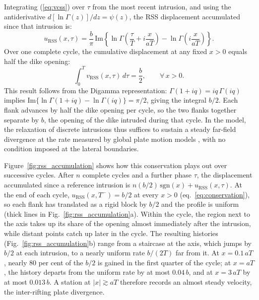 \documentclass[extra]{gji}
\newcommand{\IM}{\mathrm{Im}}
\begin{document}
Integrating (\ref{eq:vcss}) over $\tau$ from the most recent intrusion,
and using the antiderivative $d[\ln\Gamma(z)]/dz = \psi(z)$, the RSS
displacement accumulated since that intrusion is:
\begin{equation}
u_{\text{RSS}}(x,\tau) =
  \frac{b}{\pi}\,\IM\!\left\{
    \ln\Gamma\!\left(\frac{\tau}{T}+i\frac{x}{aT}\right)
    -\ln\Gamma\!\left(i\frac{x}{aT}\right)
  \right\}.
\label{eq:ucss}
\end{equation}
Over one complete cycle, the cumulative displacement at any fixed $x>0$ equals
half the dike opening:
\begin{equation}
\int_0^T v_{\text{RSS}}(x,\tau)\,d\tau = \frac{b}{2}, \qquad \forall\,x>0.
\label{eq:conservation}
\end{equation}
This result follows from the Digamma representation:
$\Gamma(1+iq) = iq\,\Gamma(iq)$ implies
$\IM\{\ln\Gamma(1+iq)-\ln\Gamma(iq)\} = \pi/2$, giving the integral $b/2$.
Each flank advances by half the dike opening per cycle, so the two flanks
together separate by $b$, the opening of the dike intruded during that
cycle. In the model, the relaxation of discrete intrusions thus suffices to
sustain a steady far-field divergence at the rate measured by global plate
motion models \citep{saria2014present,stamps2021redefining}, with no
condition imposed at the lateral boundaries.

Figure~\ref{fig:rss_accumulation} shows how this conservation plays out
over successive cycles.  After $n$ complete cycles and a further phase
$\tau$, the displacement accumulated since a reference intrusion is
$n(b/2)\,\mathrm{sgn}(x) + u_{\text{RSS}}(x,\tau)$.  At the end of each
cycle, $u_{\text{RSS}}(x,T^-) = b/2$ at every $x>0$
(eq.~\ref{eq:conservation}), so each flank has translated as a rigid
block by $b/2$ and the profile is uniform (thick lines in
Fig.~\ref{fig:rss_accumulation}a).  Within the cycle, the region next to the axis takes up its share of the
opening almost immediately after the intrusion, while distant points
catch up later in the cycle.  The resulting histories
(Fig.~\ref{fig:rss_accumulation}b) range from a staircase at the axis,
which jumps by $b/2$ at each intrusion, to a nearly uniform rate $b/(2T)$
far from it.  At $x = 0.1\,aT$, nearly 80 per cent of the $b/2$ is gained
in the first quarter of the cycle; at $x = aT$, the history departs from
the uniform rate by at most $0.04\,b$, and at $x = 3\,aT$ by at most
$0.013\,b$.  A station at $|x| \gtrsim aT$ therefore records an almost
steady velocity, the inter-rifting plate divergence.
\end{document}
